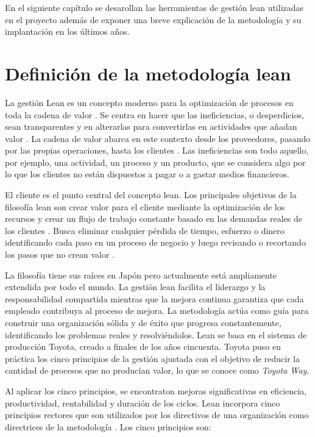 En el siguiente capítulo se desarollan las herramientas de gestión lean utilizadas en el proyecto además de exponer una breve explicación de la metodología y su implantación en los últimos años.

\section{Definición de la metodología lean}

La gestión Lean es un concepto moderno para la optimización de procesos en toda la cadena de valor \cite{helmold_progress_2019}.
Se centra en hacer que las ineficiencias, o desperdicios, sean transparentes y en alterarlas para convertirlas en actividades que añadan valor \cite{helmold_global_2016}.
La cadena de valor abarca en este contexto desde los proveedores, pasando por las propias operaciones, hasta los clientes \cite{slack_operations_2010}.
Las ineficiencias son todo aquello, por ejemplo, una actividad, un proceso y un producto, que se considera algo por lo que los clientes no están dispuestos a pagar o a gastar medios financieros.

El cliente es el punto central del concepto lean.
Los principales objetivos de la filosofía lean son crear valor para el cliente mediante la optimización de los recursos y crear un flujo de trabajo constante basado en las demandas reales de los clientes \cite{ohno_toyota_1988}. Busca eliminar cualquier pérdida de tiempo, esfuerzo o dinero identificando cada paso en un proceso de negocio y luego revisando o recortando los pasos que no crean valor \cite{bertagnolli_lean_2018}.

La filosofía tiene sus raíces en Japón pero actualmente está ampliamente extendida por todo el mundo.
La gestión lean facilita el liderazgo y la responsabilidad compartida mientras que la mejora continua garantiza que cada empleado contribuya al proceso de mejora.
La metodología actúa como guía para construir una organización sólida y de éxito que progresa constantemente, identificando los problemas reales y resolviéndolos.
Lean se basa en el sistema de producción Toyota, creado a finales de los años cincuenta.
Toyota puso en práctica los cinco principios de la gestión ajustada con el objetivo de reducir la cantidad de procesos que no producían valor, lo que se conoce como \textit{Toyota Way}.

Al aplicar los cinco principios, se encontraton mejoras significativas en eficiencia, productividad, rentabilidad y duración de los ciclos.
Lean incorpora cinco principios rectores que son utilizados por los directivos de una organización como directrices de la metodología \cite{helmold_progress_2019}. Los cinco principios son:

